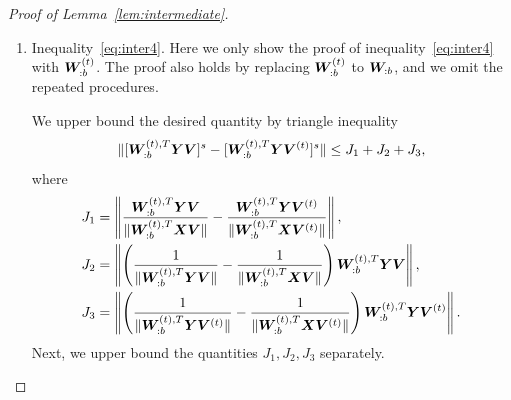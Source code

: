 \documentclass[lettersize,onecolumn,journal]{IEEEtran}
\theoremstyle{definition}
\theoremstyle{definition}
\newcommand{\of}[1]{\left(#1\right)}
\begin{document}
\begin{proof}[Proof of Lemma~\ref{lem:intermediate}]
\begin{enumerate}[wide]
     
    Hence, combining inequalities~\eqref{eq:i11} and~\eqref{eq:i12} yields  
    \begin{equation}\label{eq:i1}
        I_1 \lesssim \frac{r L^{(t)}}{\Delta_{\min}} + \sqrt{\frac{ r^{2K} + p r^{K+1}}{p^K}} \frac{\sqrt{L^{(t)}}}{\Delta_{\min}}.
    \end{equation}
    
        For $I_2$ and $I_3$, recall that $\onorm{\mW_{:b}^T \mX \mV} = \onorm{\mS_{b:}} \geq c_3$ and $\onormSize{}{  \mW_{:b}^{(t),T} \mX \mV } \geq C_1$ by inequality~\eqref{eq:i11_sin_dom}. By triangle inequality and \eqref{eq:cond1} in Condition~\ref{cond:origin}, we have 
    \begin{equation}\label{eq:i2}
         I_2 \leq \frac{ \onormSize{}{ \mW_{:b}^T \mE \mV } }{ \onormSize{}{\mW_{:b}^T \mX \mV}  } \lesssim  \onormSize{}{ \mW_{:b}^T \mE \mV }  \lesssim \frac{r^K}{p^{K/2}},
    \end{equation}
    and 
    \begin{equation}\label{eq:i3}
        I_3 \leq \frac{ \onormSize{}{ \mW_{:b}^{(t),T} \mE \mV } }{ \onormSize{}{\mW_{:b}^{(t),T} \mX \mV}  }  \lesssim \onormSize{}{ \mW_{:b}^{(t),T} \mE \mV } \lesssim \frac{r^K}{p^{K/2}}.
     \end{equation}
       Therefore, combining the inequalities~\eqref{eq:i1}, \eqref{eq:i2}, and \eqref{eq:i3}, we finish the proof of inequality~\eqref{eq:inter3}.
    
    \item Inequality~\eqref{eq:inter4}. Here we only show the proof of inequality~\eqref{eq:inter4} with $\bm{W}_{:b}^{(t)}$. The proof also holds by replacing $\bm{W}_{:b}^{(t)}$ to $\bm{W}_{:b}$, and we omit the repeated procedures.
    
    We upper bound the desired quantity by triangle inequality
    \begin{equation}
         \lVert  [   \bm{W}_{:b}^{(t), T}  \bm Y \bm{V}]^s -  [  \bm{W}_{:b}^{(t), T}  \bm Y \bm{V}^{(t)}]^s \rVert  \leq J_1 + J_2 + J_3,
    \end{equation}
    where 
    \begin{align}
        J_1 &= \onorm{ \frac{\mW_{:b}^{(t),T} \mY \mV }{\onormSize{}{ \mW_{:b}^{(t),T} \mX \mV }} - \frac{\mW_{:b}^{(t),T} \mY \mV^{(t)} }{\onormSize{}{ \mW_{:b}^{(t),T} \mX \mV^{(t)} }}  },\\
        J_2 & = \onorm{\of{ \frac{1}{\onormSize{}{\mW_{:b}^{(t),T} \mY \mV}} -  \frac{1}{\onormSize{}{\mW_{:b}^{(t),T} \mX \mV}}  } \mW_{:b}^{(t),T} \mY \mV },\\
        J_3 &= \onorm{\of{ \frac{1}{\onormSize{}{\mW_{:b}^{(t),T} \mY \mV^{(t)}}} -  \frac{1}{\onormSize{}{\mW_{:b}^{(t),T} \mX \mV^{(t)}} }  } \mW_{:b}^{(t), T} \mY \mV^{(t)} }.
    \end{align}
    Next, we upper bound the quantities $J_1, J_2, J_3$ separately. 


\end{enumerate}
\end{proof}
\end{document}
